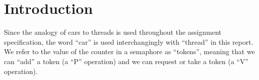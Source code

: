 \section*{Introduction}

Since the analogy of cars to threads is used throughout the assignment specification, the word ``car'' is used interchangingly with ``thread'' in this report. We refer to the value of the counter in a semaphore as ``tokens'', meaning that we can ``add'' a token (a ``P'' operation) and we can request or take a token (a ``V'' operation).

